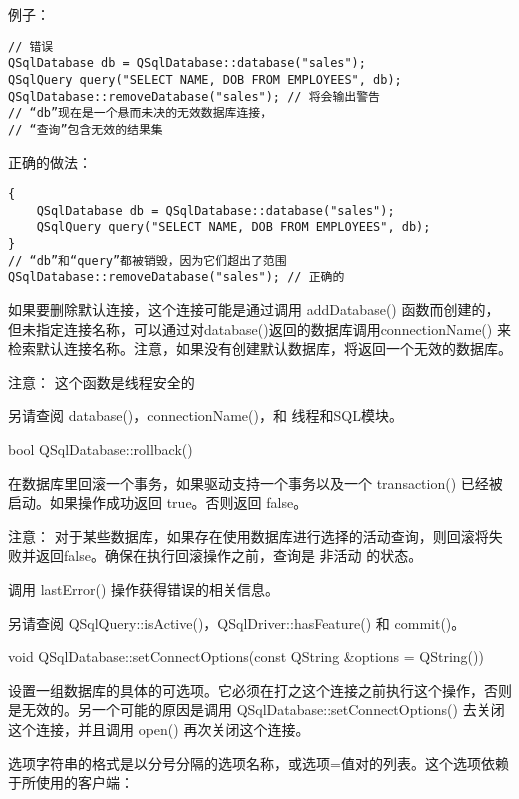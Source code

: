 例子：

\begin{lstlisting}
// 错误
QSqlDatabase db = QSqlDatabase::database("sales");
QSqlQuery query("SELECT NAME, DOB FROM EMPLOYEES", db);
QSqlDatabase::removeDatabase("sales"); // 将会输出警告
// “db”现在是一个悬而未决的无效数据库连接，
// “查询”包含无效的结果集
\end{lstlisting}


正确的做法：

\begin{lstlisting}
{
    QSqlDatabase db = QSqlDatabase::database("sales");
    QSqlQuery query("SELECT NAME, DOB FROM EMPLOYEES", db);
}
// “db”和“query”都被销毁，因为它们超出了范围
QSqlDatabase::removeDatabase("sales"); // 正确的
\end{lstlisting}

如果要删除默认连接，这个连接可能是通过调用 addDatabase() 函数而创建的，但未指定连接名称，可以通过对database()返回的数据库调用connectionName() 来检索默认连接名称。注意，如果没有创建默认数据库，将返回一个无效的数据库。

注意： 这个函数是线程安全的

另请查阅 database()，connectionName()，和 线程和SQL模块。

bool QSqlDatabase::rollback()


在数据库里回滚一个事务，如果驱动支持一个事务以及一个 transaction() 已经被启动。如果操作成功返回 true。否则返回 false。

注意： 对于某些数据库，如果存在使用数据库进行选择的活动查询，则回滚将失败并返回false。确保在执行回滚操作之前，查询是 非活动 的状态。

调用 lastError() 操作获得错误的相关信息。

另请查阅 QSqlQuery::isActive()，QSqlDriver::hasFeature() 和 commit()。

void QSqlDatabase::setConnectOptions(const QString \&options = QString())


设置一组数据库的具体的可选项。它必须在打之这个连接之前执行这个操作，否则是无效的。另一个可能的原因是调用 QSqlDatabase::setConnectOptions() 去关闭这个连接，并且调用 open() 再次关闭这个连接。

选项字符串的格式是以分号分隔的选项名称，或选项=值对的列表。这个选项依赖于所使用的客户端：


